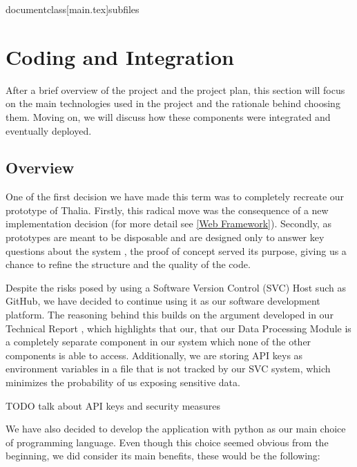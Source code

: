 documentclass[main.tex]{subfiles}




\section{Coding and Integration}

After a brief overview of the project and the project plan, this section will focus on the main technologies used in the project and the rationale behind choosing them. Moving on, we will discuss how these components were integrated and eventually deployed.

\subsection{Overview}

One of the first decision we have made this term was to completely recreate our prototype of Thalia. Firstly, this radical move was the consequence of a new implementation decision (for more detail see \ref{Web Framework}). Secondly, as prototypes are meant to be disposable and are designed only to answer key questions about the system \cite{pragmaticprog}, the proof of concept served its purpose, giving us a chance to refine the structure and the quality of the code.

Despite the risks posed by using a Software Version Control (SVC) Host such as GitHub, we have decided to continue using it as our software development platform. The reasoning behind this builds on the argument developed in our Technical Report \cite{TR}, which highlights that our, that our Data Processing Module is a completely separate component in our system which none of the other components is able to access. Additionally, we are storing API keys as environment variables in a file that is not tracked by our SVC system, which minimizes the probability of us exposing sensitive data.



TODO talk about API keys and security measures

We have also decided to develop the application with python as our main choice of programming language. Even though this choice seemed obvious from the beginning, we did consider its main benefits, these would be the following:

